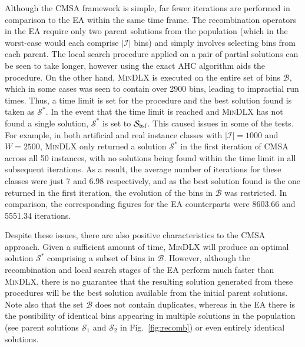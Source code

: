 \documentclass[a4paper,11pt,authoryear]{elsarticle}
\begin{document}
Although the CMSA framework is simple, far fewer iterations are performed in comparison to the EA within the same time frame. The recombination operators in the EA require only two parent solutions from the population (which in the worst-case would each comprise $|\mathcal{I}|$ bins) and simply involves selecting bins from each parent. The local search procedure applied on a pair of partial solutions can be seen to take longer, however using the exact AHC algorithm aids the procedure. On the other hand, \textsc{MinDLX} is executed on the entire set of bins $\mathcal{B}$, which in some cases was seen to contain over 2900 bins, leading to impractial run times. Thus, a time limit is set for the procedure and the best solution found is taken as $\mathcal{S}^*$. In the event that the time limit is reached and \textsc{MinDLX} has not found a single solution, $\mathcal{S}^*$ is set to $\mathcal{S}_{\textup{bsf}}$. This caused issues in some of the tests. For example, in both artificial and real instance classes with $|\mathcal{I}| = 1000$ and $W =2500$, \textsc{MinDLX} only returned a solution $\mathcal{S}^*$ in the first iteration of CMSA across all 50 instances, with no solutions being found within the time limit in all subsequent iterations. As a result, the average number of iterations for these classes were just 7 and 6.98 respectively, and as the best solution found is the one returned in the first iteration, the evolution of the bins in $\mathcal{B}$ was restricted. In comparison, the corresponding figures for the EA counterparts were 8603.66 and 5551.34 iterations.

Despite these issues, there are also positive characteristics to the CMSA approach. Given a sufficient amount of time, \textsc{MinDLX} will produce an optimal solution $\mathcal{S}^*$ comprising a subset of bins in $\mathcal{B}$. However, although the recombination and local search stages of the EA perform much faster than \textsc{MinDLX}, there is no guarantee that the resulting solution generated from these procedures will be the best solution available from the initial parent solutions. Note also that the set $\mathcal{B}$ does not contain duplicates, whereas in the EA there is the possibility of identical bins appearing in multiple solutions in the population (see parent solutions $\mathcal{S}_1$ and $\mathcal{S}_2$ in Fig.~\ref{fig:recomb}) or even entirely identical solutions.


\end{document}
